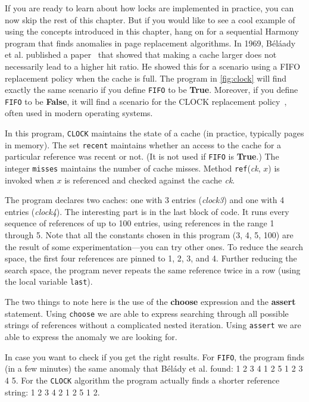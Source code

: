 \documentclass{report}
\begin{document}
If you are ready to learn about how locks are implemented in practice,
you can now skip the rest of this chapter.  But if you would like to
see a cool example of using the concepts introduced in this chapter,
hang on for a sequential Harmony program that finds anomalies in page
replacement algorithms.
In 1969, B\'{e}l\'{a}ady et al. published a paper~\cite{Belady69}
that showed that making a
cache larger does not necessarily lead to a higher hit ratio.  He showed
this for a scenario using a FIFO replacement policy when the cache is full. 
The program in \autoref{fig:clock} will find exactly the same scenario
if you define \texttt{FIFO} to be \textbf{True}.  Moreover, if you define
\texttt{FIFO} to be \textbf{False}, it will find a scenario for the
CLOCK replacement policy~\cite{clock}, often used in modern operating systems.

In this program, \texttt{CLOCK} maintains the state of a cache
(in practice, typically pages in memory).
The set \texttt{recent} maintains whether an access to the cache
for a particular reference was recent or not.
(It is not used if \texttt{FIFO} is \textbf{True}.)
The integer \texttt{misses} maintains the number of cache misses.
Method \texttt{ref}(\textit{ck}, $x$) is invoked when $x$ is
referenced and checked against the cache \textit{ck}.

The program declares two caches: one with 3 entries (\textit{clock3})
and one with 4 entries (\textit{clock4}).
The interesting part is in the last block of code.
It runs every sequence of references of up to 100 entries, using
references in the range 1 through 5.
Note that all the constants chosen in this program (3, 4, 5, 100)
are the result of some experimentation---you can try other ones.
To reduce the search space, the first four references are pinned
to 1, 2, 3, and 4.
Further reducing the search space, the program never repeats the
same reference twice in a row (using the local variable \texttt{last}).

The two things to note here is the use of the \textbf{choose}
expression and the \textbf{assert} statement.  Using \texttt{choose}
we are able to express searching through all possible strings of
references without a complicated nested iteration.
Using \texttt{assert} we are able to express the anomaly we are
looking for.

In case you want to check if you get the right results.  For \texttt{FIFO},
the program finds (in a few minutes) the same anomaly that
B\'{e}l\'{a}dy et al. found: 1 2 3 4 1 2 5 1 2 3 4 5.
For the \texttt{CLOCK} algorithm the program actually finds a shorter
reference string: 1 2 3 4 2 1 2 5 1 2.
\end{document}
